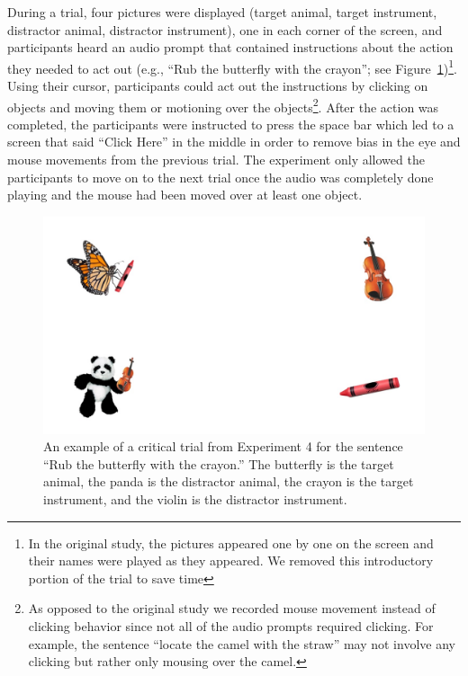 \documentclass[
  man,floatsintext]{apa6}
\begin{document}
During a trial, four pictures were displayed (target animal, target
instrument, distractor animal, distractor instrument), one in each
corner of the screen, and participants heard an audio prompt that
contained instructions about the action they needed to act out (e.g.,
``Rub the butterfly with the crayon''; see Figure~\ref{fig:E4-example-trial})\footnote{In the original study, the pictures appeared one by one on the
  screen and their names were played as they appeared. We removed this
  introductory portion of the trial to save time}. Using their
cursor, participants could act out the instructions by clicking on
objects and moving them or motioning over the objects\footnote{As opposed to the original study we recorded mouse movement
  instead of clicking behavior since not all of the audio prompts
  required clicking. For example, the sentence ``locate the camel with
  the straw'' may not involve any clicking but rather only mousing over
  the camel.}. After the
action was completed, the participants were instructed to press the
space bar which led to a screen that said ``Click Here'' in the middle in
order to remove bias in the eye and mouse movements from the previous
trial. The experiment only allowed the participants to move on to the
next trial once the audio was completely done playing and the mouse had
been moved over at least one object.

\begin{figure}
\centering
\includegraphics{group-d/E4-example-figure.jpeg}
\caption{\label{fig:E4-example-trial}An example of a critical trial from Experiment 4 for the sentence ``Rub the butterfly with the crayon.'' The butterfly is the target animal, the panda is the distractor animal, the crayon is the target instrument, and the violin is the distractor instrument.}
\end{figure}
\end{document}
